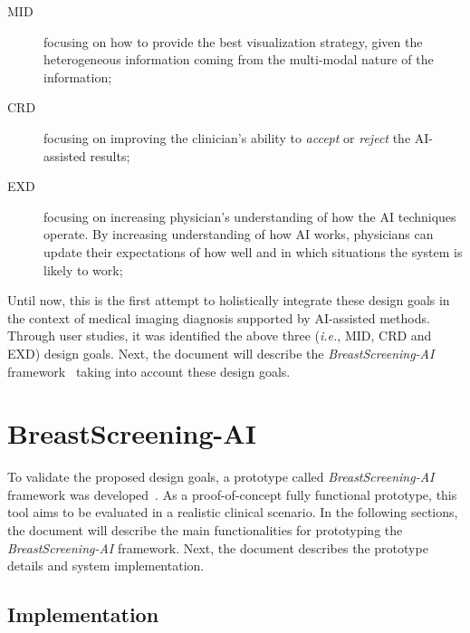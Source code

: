 \begin{description}
\item[\ac{MID}] focusing on how to provide the best visualization strategy, given the heterogeneous information coming from the multi-modal nature of the information;

\vspace{0.50mm}

\item[\ac{CRD}] focusing on improving the clinician's ability to {\it accept} or {\it reject} the \ac{AI}-assisted results;

\vspace{0.50mm}

\item[\ac{EXD}] focusing on increasing physician's understanding of how the \ac{AI} techniques operate. By increasing understanding of how \ac{AI} works, physicians can update their expectations of how well and in which situations the system is likely to work;
\end{description}

\vspace{1.50mm}

Until now, this is the first attempt to holistically integrate these design goals in the context of medical imaging diagnosis supported by \ac{AI}-assisted methods.
Through user studies, it was identified the above three ({\it i.e.}, \ac{MID}, \ac{CRD} and \ac{EXD}) design goals.
Next, the document will describe the {\it BreastScreening-AI} framework~\cite{CALISTO2021102607} taking into account these design goals.

\section{BreastScreening-AI}
\label{sec:chap005004}

To validate the proposed design goals, a prototype called {\it BreastScreening-AI} framework was developed~\cite{CALISTO2021102607}.
As a proof-of-concept fully functional prototype, this tool aims to be evaluated in a realistic clinical scenario.
In the following sections, the document will describe the main functionalities for prototyping the {\it BreastScreening-AI} framework.
Next, the document describes the prototype details and system implementation.

\subsection{Implementation}
\label{sec:chap005004001}

